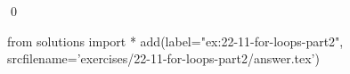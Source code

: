 
\begin{ex}
  \label{ex:22-11-for-loops-part2}
  
  \qed
\end{ex}
\begin{python0}
from solutions import *
add(label="ex:22-11-for-loops-part2",
    srcfilename='exercises/22-11-for-loops-part2/answer.tex')
\end{python0}
